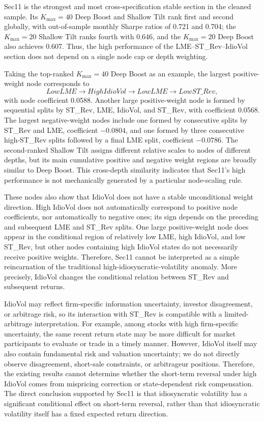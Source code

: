 \documentclass[12pt]{article}
\def\text#1{#1}%
\begin{document}
Sec11 is the strongest and most cross-specification stable section in the cleaned sample. Its \(K_{\max}=40\) Deep Boost and Shallow Tilt rank first and second globally, with out-of-sample monthly Sharpe ratios of 0.721 and 0.704; the \(K_{\max}=20\) Shallow Tilt ranks fourth with 0.646, and the \(K_{\max}=20\) Deep Boost also achieves 0.607. Thus, the high performance of the LME–ST\_Rev–IdioVol section does not depend on a single node cap or depth weighting.

Taking the top-ranked \(K_{\max}=40\) Deep Boost as an example, the largest positive-weight node corresponds to
\[
\text{Low LME}\rightarrow\text{High IdioVol}\rightarrow
\text{Low LME}\rightarrow\text{Low ST\_Rev},
\]
with node coefficient 0.0588. Another large positive-weight node is formed by sequential splits by ST\_Rev, LME, IdioVol, and ST\_Rev, with coefficient 0.0568. The largest negative-weight nodes include one formed by consecutive splits by ST\_Rev and LME, coefficient \(-0.0804\), and one formed by three consecutive high-ST\_Rev splits followed by a final LME split, coefficient \(-0.0786\). The second-ranked Shallow Tilt assigns different relative scales to nodes of different depths, but its main cumulative positive and negative weight regions are broadly similar to Deep Boost. This cross-depth similarity indicates that Sec11's high performance is not mechanically generated by a particular node-scaling rule.

These nodes also show that IdioVol does not have a stable unconditional weight direction. High IdioVol does not automatically correspond to positive node coefficients, nor automatically to negative ones; its sign depends on the preceding and subsequent LME and ST\_Rev splits. One large positive-weight node does appear in the conditional region of relatively low LME, high IdioVol, and low ST\_Rev, but other nodes containing high IdioVol states do not necessarily receive positive weights. Therefore, Sec11 cannot be interpreted as a simple reincarnation of the traditional high-idiosyncratic-volatility anomaly. More precisely, IdioVol changes the conditional relation between ST\_Rev and subsequent returns.

IdioVol may reflect firm-specific information uncertainty, investor disagreement, or arbitrage risk, so its interaction with ST\_Rev is compatible with a limited-arbitrage interpretation. For example, among stocks with high firm-specific uncertainty, the same recent return state may be more difficult for market participants to evaluate or trade in a timely manner. However, IdioVol itself may also contain fundamental risk and valuation uncertainty; we do not directly observe disagreement, short-sale constraints, or arbitrageur positions. Therefore, the existing results cannot determine whether the short-term reversal under high IdioVol comes from mispricing correction or state-dependent risk compensation. The direct conclusion supported by Sec11 is that idiosyncratic volatility has a significant conditional effect on short-term reversal, rather than that idiosyncratic volatility itself has a fixed expected return direction.
\end{document}
